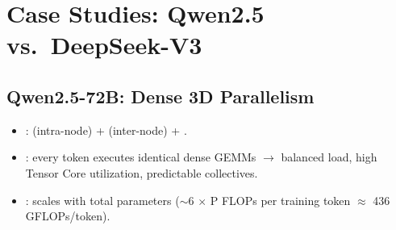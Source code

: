 \section{Case Studies: Qwen2.5 vs.\ DeepSeek-V3}

\subsection{Qwen2.5-72B: Dense 3D Parallelism}
\begin{itemize}
    \item {}:  (intra-node) +  (inter-node) + .
    \item {}: every token executes identical dense GEMMs $\rightarrow$ balanced load, high Tensor Core utilization, predictable collectives.
    \item {}: scales with total parameters ($\sim$6 $\times$ P FLOPs per training token $\approx$ 436 GFLOPs/token).
\end{itemize}

